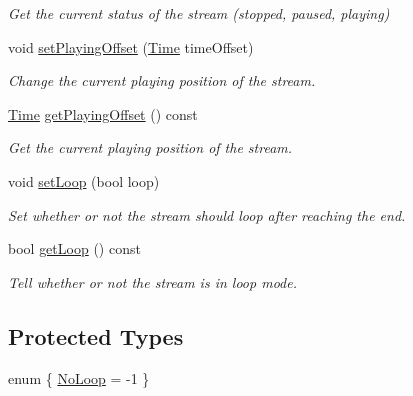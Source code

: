 \begin{DoxyCompactItemize}
\begin{DoxyCompactList}\small\item\em Get the current status of the stream (stopped, paused, playing) \end{DoxyCompactList}\item 
void \mbox{\hyperlink{classsf_1_1_sound_stream_af416a5f84c8750d2acb9821d78bc8646}{set\+Playing\+Offset}} (\mbox{\hyperlink{classsf_1_1_time}{Time}} time\+Offset)
\begin{DoxyCompactList}\small\item\em Change the current playing position of the stream. \end{DoxyCompactList}\item 
\mbox{\hyperlink{classsf_1_1_time}{Time}} \mbox{\hyperlink{classsf_1_1_sound_stream_ae288f3c72edbad9cc7ee938ce5b907c1}{get\+Playing\+Offset}} () const
\begin{DoxyCompactList}\small\item\em Get the current playing position of the stream. \end{DoxyCompactList}\item 
void \mbox{\hyperlink{classsf_1_1_sound_stream_a43fade018ffba7e4f847a9f00b353f3d}{set\+Loop}} (bool loop)
\begin{DoxyCompactList}\small\item\em Set whether or not the stream should loop after reaching the end. \end{DoxyCompactList}\item 
bool \mbox{\hyperlink{classsf_1_1_sound_stream_a49d263f9bbaefec4b019bd05fda59b25}{get\+Loop}} () const
\begin{DoxyCompactList}\small\item\em Tell whether or not the stream is in loop mode. \end{DoxyCompactList}\end{DoxyCompactItemize}
\subsection*{Protected Types}
\begin{DoxyCompactItemize}
\item 
enum \{ \mbox{\hyperlink{classsf_1_1_sound_stream_a7707214e7cd4ffcf1c123e7bcab4092aa2f2c638731fdff0d6fe4e3e82b6f6146}{No\+Loop}} = -\/1
 \}
\end{DoxyCompactItemize}
